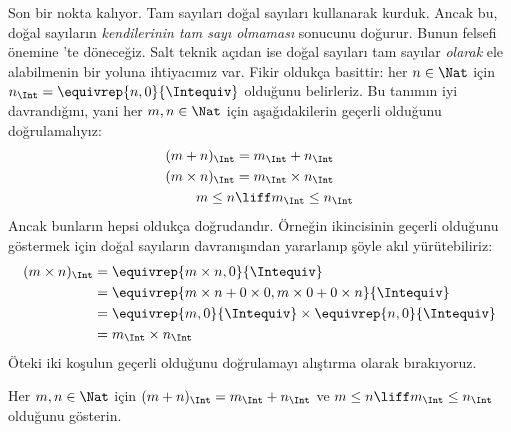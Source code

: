 Son bir nokta kalıyor. Tam sayıları doğal sayıları kullanarak kurduk. Ancak bu,
doğal sayıların \emph{kendilerinin tam sayı olmaması} sonucunu doğurur. Bunun
felsefi önemine 'te döneceğiz. Salt teknik açıdan ise doğal
sayıları tam sayılar \emph{olarak} ele alabilmenin bir yoluna ihtiyacımız var.
Fikir oldukça basittir: her $n \in \Nat$ için
$n_\Int = \equivrep{n, 0}{\Intequiv}$ olduğunu belirleriz. Bu tanımın iyi
davrandığını, yani her $m, n \in \Nat$ için aşağıdakilerin geçerli olduğunu
doğrulamalıyız:
\begin{align*}
	(m + n)_\Int &= m_\Int + n_\Int\\
	(m \times n)_\Int &= m_\Int \times n_\Int\\
	m \leq n &\liff m_\Int \leq n_\Int
\end{align*}
Ancak bunların hepsi oldukça doğrudandır. Örneğin ikincisinin geçerli olduğunu
göstermek için doğal sayıların davranışından yararlanıp şöyle akıl yürütebiliriz:
	\begin{align*}
		(m \times n)_\Int  &= \equivrep{m \times n, 0}{\Intequiv} \\
		&= \equivrep{m \times n + 0 \times 0, m \times 0 + 0 \times n}{\Intequiv} \\
		&= \equivrep{m, 0}{\Intequiv} \times \equivrep{n, 0}{\Intequiv} \\
		&= m_\Int \times n_\Int
	\end{align*}
Öteki iki koşulun geçerli olduğunu doğrulamayı alıştırma olarak bırakıyoruz.
\begin{prob}
	Her $m, n \in \Nat$ için $(m + n)_\Int = m_\Int + n_\Int$ ve
	$m \leq n \liff m_\Int \leq n_\Int$ olduğunu gösterin.
\end{prob}
